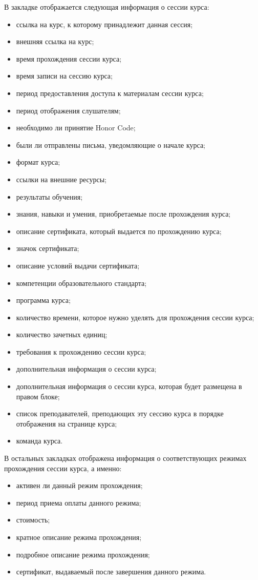 	В закладке  отображается следующая информация о сессии курса:
	\begin{itemize}
		\item ссылка на курс, к которому принадлежит данная сессия;
		\item внешняя ссылка на курс;
		\item время прохождения сессии курса;
		\item время записи на сессию курса;
		\item период предоставления доступа к материалам сессии курса;
		\item период отображения слушателям;
		\item необходимо ли принятие Honor Code;
		\item были ли отправлены письма, уведомляющие о начале курса;
		\item формат курса;
		\item ссылки на внешние ресурсы;
		\item результаты обучения;
		\item знания, навыки и умения, приобретаемые после прохождения курса;
		\item описание сертификата, который выдается по прохождению курса;
		\item значок сертификата;
		\item описание условий выдачи сертификата;
		\item компетенции образовательного стандарта;
		\item программа курса;
		\item количество времени, которое нужно уделять для прохождения сессии курса;
		\item количество зачетных единиц;
		\item требования к прохождению сессии курса;
		\item дополнительная информация о сессии курса;
		\item дополнительная информация о сессии курса, которая будет размещена в правом блоке;
		\item список преподавателей, преподающих эту сессию курса в порядке отображения на странице курса;
		\item команда курса. 
	\end{itemize}
	
	В остальных закладках отображена информация о соответствующих режимах прохождения сессии курса, а именно:
	\begin{itemize}
		\item активен ли данный режим прохождения;
		\item период приема оплаты данного режима;
		\item стоимость;
		\item кратное описание режима прохождения;
		\item подробное описание режима прохождения;
		\item сертификат, выдаваемый после завершения данного режима.
	\end{itemize}

